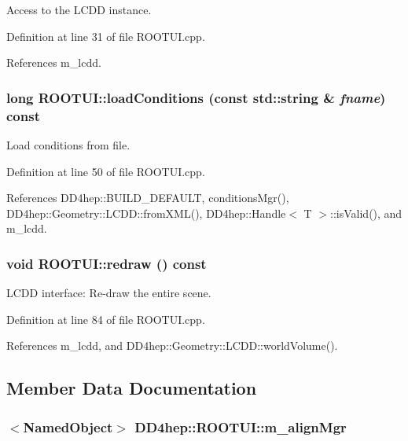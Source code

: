 Access to the LCDD instance. 

Definition at line 31 of file ROOTUI.cpp.

References m\_\-lcdd.\hypertarget{class_d_d4hep_1_1_r_o_o_t_u_i_a01bf0e443e30c09a85381461d9cc5f5a}{
\subsubsection[{loadConditions}]{\setlength{\rightskip}{0pt plus 5cm}long ROOTUI::loadConditions (const std::string \& {\em fname}) const}}
\label{class_d_d4hep_1_1_r_o_o_t_u_i_a01bf0e443e30c09a85381461d9cc5f5a}


Load conditions from file. 

Definition at line 50 of file ROOTUI.cpp.

References DD4hep::BUILD\_\-DEFAULT, conditionsMgr(), DD4hep::Geometry::LCDD::fromXML(), DD4hep::Handle$<$ T $>$::isValid(), and m\_\-lcdd.\hypertarget{class_d_d4hep_1_1_r_o_o_t_u_i_ab7154426f968621a5b8ad26b57716fec}{
\subsubsection[{redraw}]{\setlength{\rightskip}{0pt plus 5cm}void ROOTUI::redraw () const}}
\label{class_d_d4hep_1_1_r_o_o_t_u_i_ab7154426f968621a5b8ad26b57716fec}


LCDD interface: Re-\/draw the entire scene. 

Definition at line 84 of file ROOTUI.cpp.

References m\_\-lcdd, and DD4hep::Geometry::LCDD::worldVolume().

\subsection{Member Data Documentation}
\hypertarget{class_d_d4hep_1_1_r_o_o_t_u_i_a4e3cba5482c1e2fa75291a27437d039b}{
\subsubsection[{m\_\-alignMgr}]{$<${\bf NamedObject}$>$ {\bf DD4hep::ROOTUI::m\_\-alignMgr}}}
\label{class_d_d4hep_1_1_r_o_o_t_u_i_a4e3cba5482c1e2fa75291a27437d039b}


